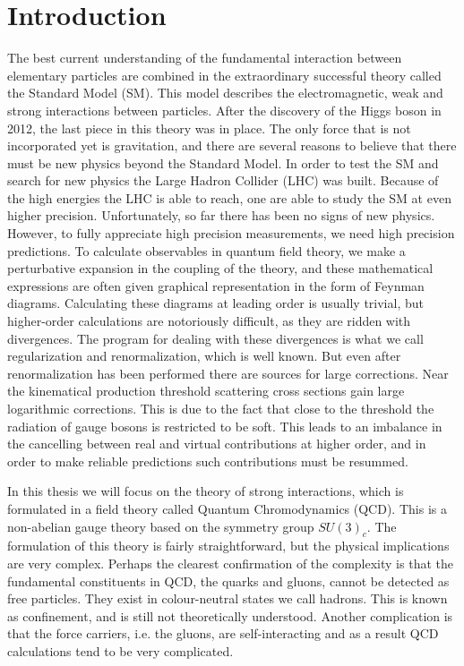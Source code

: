 \chapter*{Introduction}
The best current understanding of the fundamental interaction between elementary particles are combined in the extraordinary successful theory called the Standard Model (SM). This model describes the electromagnetic, weak and strong interactions between particles. After the discovery of the Higgs boson in 2012, the last piece in this theory was in place. The only force that is not incorporated yet is gravitation, and there are several reasons to believe that there must be new physics beyond the Standard Model. In order to test the SM and search for new physics the Large Hadron Collider (LHC) was built. Because of the high energies the LHC is able to reach, one are able to study the SM at even higher precision. Unfortunately, so far there has been no signs of new physics. However, to fully appreciate high precision measurements, we need high precision predictions. To calculate observables in quantum field theory, we make a perturbative expansion in the coupling of the theory, and these mathematical expressions are often given graphical representation in the form of Feynman diagrams. Calculating these diagrams at leading order is usually trivial, but higher-order calculations are notoriously difficult, as they are ridden with divergences. The program for dealing with these divergences is what we call regularization and renormalization, which is well known. But even after renormalization has been performed there are sources for large corrections. Near the kinematical production threshold scattering cross sections gain large logarithmic corrections. This is due to the fact that close to the threshold the radiation of gauge bosons is restricted to be soft. This leads to an imbalance in the cancelling between real and virtual contributions at higher order, and in order to make reliable predictions such contributions must be resummed.

In this thesis we will focus on the theory of strong interactions, which is formulated in a field theory called Quantum Chromodynamics (QCD). This is a non-abelian gauge theory based on the symmetry group $SU(3)_{c}$. The formulation of this theory is fairly straightforward, but the physical implications are very complex. Perhaps the clearest confirmation of the complexity is that the fundamental constituents in QCD, the quarks and gluons, cannot be detected as free particles. They exist in colour-neutral states we call hadrons. This is known as confinement, and is still not theoretically understood. Another complication is that the force carriers, i.e. the gluons, are self-interacting and as a result QCD calculations tend to be very complicated. 

